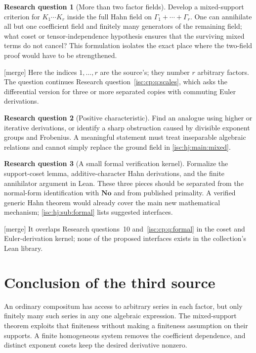 \documentclass[11pt,letterpaper]{article}
\theoremstyle{definition}
\newtheorem{question}{Research question}
\theoremstyle{remark}
\newcommand{\No}{\mathbf{No}}
\newcommand{\mtag}{\textup{[merge]}}%
\numberwithin{equation}{section}
\begin{document}
\begin{question}[More than two factor fields]\label{isc:hj:q:factors}
Develop a mixed-support criterion for
$K_1\cdots K_r$ inside the full Hahn field on
$\Gamma_1+\cdots+\Gamma_r$. One can annihilate all but one coefficient
field and finitely many generators of the remaining field; what coset
or tensor-independence hypothesis ensures that the surviving mixed
terms do not cancel? This formulation isolates the exact place where
the two-field proof would have to be strengthened.
\end{question}
\mtag{} Here the indices $1,\ldots,r$ are the source's; they number $r$
arbitrary factors. The question continues
Research question~\ref{isc:cp:q:scales}, which asks the differential
version for three or more separated copies with commuting Euler
derivations.

\begin{question}[Positive characteristic]\label{isc:hj:q:charp}
Find an analogue using higher or iterative derivations, or identify a
sharp obstruction caused by divisible exponent groups and Frobenius.
A meaningful statement must treat inseparable algebraic relations and
cannot simply replace the ground field in \cref{isc:hj:main:mixed}.
\end{question}

\begin{question}[A small formal verification kernel]\label{isc:hj:q:formal}
Formalize the support-coset lemma, additive-character Hahn derivations,
and the finite annihilator argument in Lean. These three pieces should
be separated from the normal-form identification with $\No$ and from
published primality. A verified generic Hahn theorem would already
cover the main new mathematical mechanism; \cref{isc:hj:sub:formal} lists
suggested interfaces.
\end{question}
\mtag{} It overlaps Research questions~10 and~\ref{isc:cp:q:formal} in the
coset and Euler-derivation kernel; none of the proposed interfaces exists
in the collection's Lean library.

\section{Conclusion of the third source}\label{isc:hj:sec:conclusion}

An ordinary compositum has access to arbitrary series in each factor,
but only finitely many such series in any one algebraic expression.
The mixed-support theorem exploits that finiteness without making a
finiteness assumption on their supports. A finite homogeneous system
removes the coefficient dependence, and distinct exponent cosets keep
the desired derivative nonzero.
\end{document}
